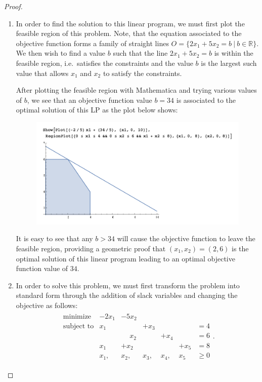 \documentclass[12pt]{article}
\theoremstyle{definition}
\begin{document}
\begin{proof}
  \begin{enumerate}
    \item In order to find the solution to this linear program, we must first
      plot the feasible region of this problem. Note, that the equation associated
      to the objective function forms a family of straight lines $O = \{2x_1 + 5x_2 = b\ |\ b\in \mathbb{R}\}$.
      We then wish to find a value $b$ such that the line $2x_1 + 5x_2 = b$ is within the
      feasible region, i.e.\ satisfies the constraints and the value $b$ is the
      largest such value that allows $x_1$ and $x_2$ to satisfy the constraints.

      After plotting the feasible region with Mathematica and trying various values of $b$,
      we see that an objective function value $b=34$ is associated to the optimal solution of this LP
      as the plot below shows:
      \begin{figure}[!h]
        \centerline{\includegraphics[scale=0.9]{geometric_solution}}
      \end{figure}

      It is easy to see that any $b > 34$ will cause the objective function to
      leave the feasible region, providing a geometric proof that $(x_1, x_2) = (2, 6)$
      is the optimal solution of this linear program leading to an optimal objective
      function value of $34$.
    \item In order to solve this problem, we must first transform the problem into
      standard form through the addition of slack variables and changing the
      objective as follows:
      \begin{align*}
        \begin{array}{rllllll}
          \text{minimize} & -2x_1 &-5x_2 & & & &\\
          \text{subject to} & x_1 & &+ x_3& & &= 4 \\
          & & \phantom{+}x_2 & &+ x_4 & &= 6 \\
          & x_1 &+ x_2& &  &+ x_5 &= 8 \\
          &x_1, &x_2, &x_3, &x_4, &x_5 &\geq 0
        \end{array}.
      \end{align*}


\end{enumerate}
\end{proof}
\end{document}
